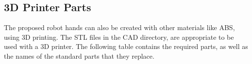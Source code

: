 \begin{center}
%
\end{center}

\newpage

\subsection{3D Printer Parts}

The proposed robot hands can also be created with other materials like ABS, using 3D printing. The STL files in the CAD directory, are 
appropriate to be used with a 3D printer. The following table contains the required parts, as well as the names of the standard parts that they replace. 

\vspace{0.2cm}

